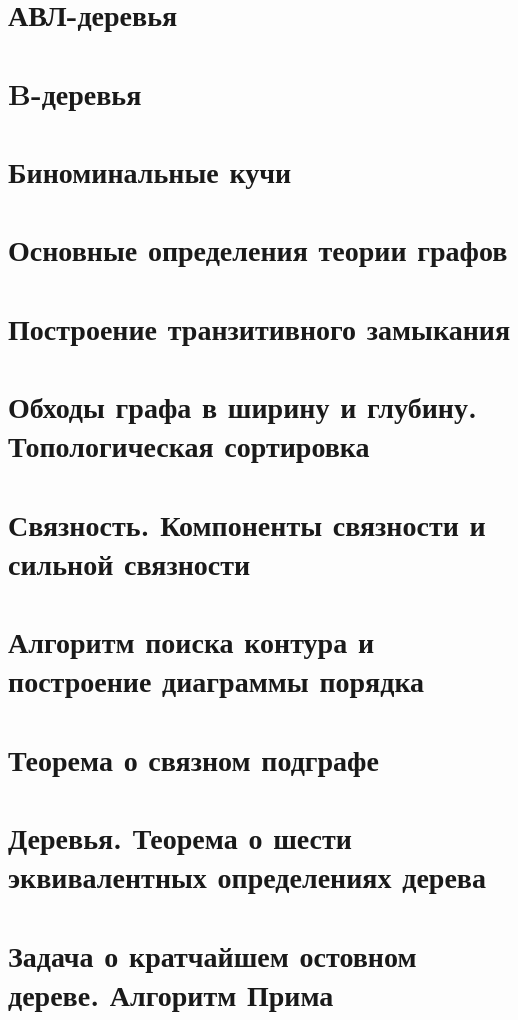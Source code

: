 \documentclass[12pt, fleqn]{article}
\begin{document}
\section{АВЛ-деревья}


\section{B-деревья}


\section{Биноминальные кучи}


\section{Основные определения теории графов}


\section{Построение транзитивного замыкания}


\section{Обходы графа в ширину и глубину. Топологическая сортировка}


\section{Связность. Компоненты связности и сильной связности}


\section{Алгоритм поиска контура и построение диаграммы порядка}


\section{Теорема о связном подграфе}


\section{Деревья. Теорема о шести эквивалентных определениях дерева}


\section{Задача о кратчайшем остовном дереве. Алгоритм Прима}
\end{document}
